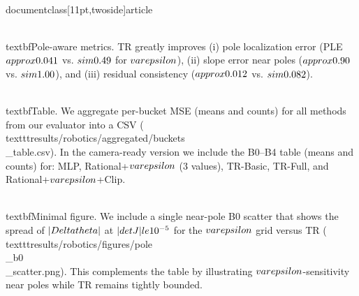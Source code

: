 \\documentclass[11pt,twoside]{article}
\begin{document}
\\textbf{Pole-aware metrics.} TR greatly improves (i) pole localization error (PLE $\\approx 0.041$ vs. $\\sim 0.49$ for $\\varepsilon$), (ii) slope error near poles ($\\approx 0.90$ vs. $\\sim 1.00$), and (iii) residual consistency ($\\approx 0.012$ vs. $\\sim 0.082$).

\\textbf{Table.} We aggregate per-bucket MSE (means and counts) for all methods from our evaluator into a CSV (\\texttt{results/robotics/aggregated/buckets\\_table.csv}). In the camera-ready version we include the B0--B4 table (means and counts) for: MLP, Rational+$\\varepsilon$ (3 values), TR-Basic, TR-Full, and Rational+$\\varepsilon$+Clip.

\\textbf{Minimal figure.} We include a single near-pole B0 scatter that shows the spread of $\\|\\Delta\\theta\\|$ at $|\\det J|\\le 10^{-5}$ for the $\\varepsilon$ grid versus TR (\\texttt{results/robotics/figures/pole\\_b0\\_scatter.png}). This complements the table by illustrating $\\varepsilon$-sensitivity near poles while TR remains tightly bounded.
\end{document}
